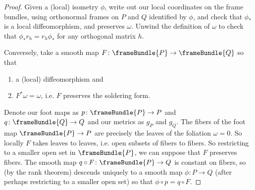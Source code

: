 \begin{proof}
Given a (local) isometry \(\phi\), write out our local coordinates on the frame bundles, using orthonormal frames on \(P\) and \(Q\) identified by \(\phi\), and check that \(\phi_*\) is a local diffeomorphism, and preserves \(\omega\).
Unwind the definition of \(\omega\) to check that \(\phi_* r_h= r_h \phi_*\) for any orthogonal matrix \(h\).

Conversely, take a smooth map \(F \colon \frameBundle{P} \to \frameBundle{Q}\) so that
\begin{enumerate}
\item
a (local) diffeomorphism  and
\item
\(F^* \omega=\omega\), i.e. \(F\) preserves the soldering form.
\end{enumerate}
Denote our foot maps as \(p \colon \frameBundle{P} \to P\) and \(q \colon \frameBundle{Q} \to Q\) and our metrics as \(g_P\) and \(g_Q\).
The fibers of the foot map \(\frameBundle{P} \to P\) are precisely the leaves of the foliation \(\omega=0\).
So locally \(F\) takes leaves to leaves, i.e. open subsets of fibers to fibers.
So restricting to a smaller open set in \(\frameBundle{P}\), we can suppose that \(F\) preserves fibers.
The smooth map \(q \circ F \colon \frameBundle{P} \to Q\) is constant on fibers, so (by the rank theorem) descends uniquely to a smooth map \(\phi \colon P \to Q\) (after perhaps restricting to a smaller open set) so that \(\phi \circ p = q \circ F\).


\end{proof}
